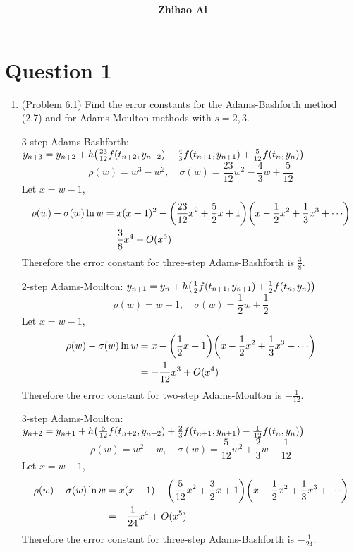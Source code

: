 \documentclass[10pt]{report}
\title{
	\vspace{2in}
	\textmd{\textbf{\hwCourse\\\hwTitle}}\\
	\vspace{0.3in}\large{\textit{\hmwkClassInstructor}}
	\vspace{3in}
}
\author{\textbf{Zhihao Ai}}
\date{}
\DeclarePairedDelimiter\autoparen{(}{)}
\newcommand{\pa}[1]{\autoparen*{#1}}
\begin{document}
\maketitle

\section*{Question 1}
\begin{enumerate}
	\item 
	(Problem 6.1) Find the error constants for the Adams-Bashforth method (2.7) and for Adams-Moulton methods with $s = 2, 3$.
	
	3-step Adams-Bashforth: $y_{n+3} = y_{n+2} + h\pa{ \frac{23}{12}f(t_{n+2}, y_{n+2}) - \frac{4}{3}f(t_{n+1}, y_{n+1}) + \frac{5}{12}f(t_{n}, y_{n})}$
	\[
	\rho(w) = w^3 - w^2,\quad \sigma(w) = \frac{23}{12}w^2 - \frac{4}{3}w + \frac{5}{12}
	\]
	Let $x=w-1$,
	\begin{align*}
	\rho(w) - \sigma(w) \ln{w}
	&= x(x+1)^2 - \pa{\frac{23}{12}x^2 + \frac{5}{2}x + 1} \pa{x-\frac{1}{2}x^2 + \frac{1}{3}x^3 + \cdots}\\
	&= \frac{3}{8}x^4 + O(x^5)
	\end{align*}
	Therefore the error constant for three-step Adams-Bashforth is $\frac{3}{8}$.
	
	2-step Adams-Moulton: $y_{n+1} = y_{n} + h\pa{ \frac{1}{2}f(t_{n+1}, y_{n+1}) + \frac{1}{2}f(t_{n}, y_{n})}$
	\[
	\rho(w) = w - 1,\quad \sigma(w) = \frac{1}{2}w + \frac{1}{2}
	\]
	Let $x=w-1$,
	\begin{align*}
	\rho(w) - \sigma(w) \ln{w}
	&= x - \pa{\frac{1}{2}x + 1} \pa{x-\frac{1}{2}x^2 + \frac{1}{3}x^3 + \cdots}\\
	&= -\frac{1}{12}x^3 + O(x^4)
	\end{align*}
	Therefore the error constant for two-step Adams-Moulton is $-\frac{1}{12}$.
	
	3-step Adams-Moulton: $y_{n+2} = y_{n+1} + h\pa{ \frac{5}{12}f(t_{n+2}, y_{n+2}) + \frac{2}{3}f(t_{n+1}, y_{n+1}) - \frac{1}{12}f(t_{n}, y_{n})}$
	\[
	\rho(w) = w^2 - w,\quad \sigma(w) = \frac{5}{12}w^2 + \frac{2}{3}w - \frac{1}{12}
	\]
	Let $x=w-1$,
	\begin{align*}
	\rho(w) - \sigma(w) \ln{w}
	&= x(x+1) - \pa{\frac{5}{12}x^2 + \frac{3}{2}x + 1} \pa{x-\frac{1}{2}x^2 + \frac{1}{3}x^3 + \cdots}\\
	&= -\frac{1}{24}x^4 + O(x^5)
	\end{align*}
	Therefore the error constant for three-step Adams-Bashforth is $-\frac{1}{24}$.
	

\end{enumerate}
\end{document}

